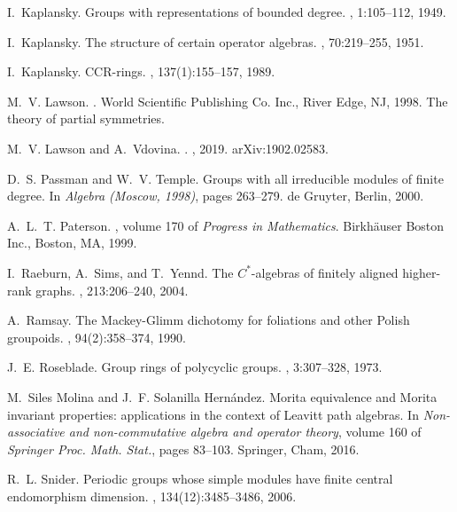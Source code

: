 \documentclass[11pt,reqno]{amsart}
\theoremstyle{plain}
\numberwithin{equation}{section}
\begin{document}
\begin{thebibliography}{10}
I.~Kaplansky.
\newblock Groups with representations of bounded degree.
, 1:105--112, 1949.

I.~Kaplansky.
\newblock The structure of certain operator algebras.
, 70:219--255, 1951.

I.~Kaplansky.
\newblock C{CR}-rings.
, 137(1):155--157, 1989.

M.~V. Lawson.
.
\newblock World Scientific Publishing Co. Inc., River Edge, NJ, 1998.
\newblock The theory of partial symmetries.

M.~V. {Lawson} and A.~{Vdovina}.
.
, 2019.
\newblock arXiv:1902.02583.

D.~S. Passman and W.~V. Temple.
\newblock Groups with all irreducible modules of finite degree.
\newblock In {\em Algebra ({M}oscow, 1998)}, pages 263--279. de Gruyter,
  Berlin, 2000.

A.~L.~T. Paterson.
,
  volume 170 of {\em Progress in Mathematics}.
\newblock Birkh\"{a}user Boston Inc., Boston, MA, 1999.

I.~Raeburn, A.~Sims, and T.~Yennd.
\newblock The {$C^{\ast}$}-algebras of finitely aligned higher-rank graphs.
, 213:206--240, 2004.

A.~Ramsay.
\newblock The {M}ackey-{G}limm dichotomy for foliations and other {P}olish
  groupoids.
, 94(2):358--374, 1990.

J.~E. Roseblade.
\newblock Group rings of polycyclic groups.
, 3:307--328, 1973.

M.~{Siles Molina} and J.~F. {Solanilla Hern\'{a}ndez}.
\newblock Morita equivalence and {M}orita invariant properties: applications in
  the context of {L}eavitt path algebras.
\newblock In {\em Non-associative and non-commutative algebra and operator
  theory}, volume 160 of {\em Springer Proc. Math. Stat.}, pages 83--103.
  Springer, Cham, 2016.

R.~L. Snider.
\newblock Periodic groups whose simple modules have finite central endomorphism
  dimension.
, 134(12):3485--3486, 2006.


\end{thebibliography}
\end{document}
